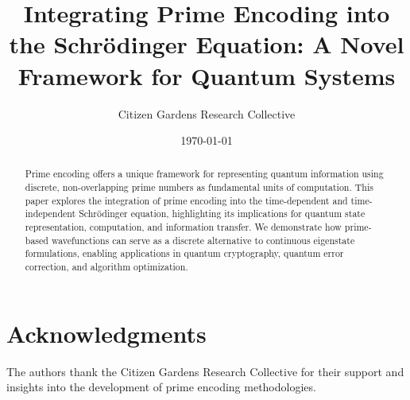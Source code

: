 \documentclass{article}
\title{Integrating Prime Encoding into the Schrödinger Equation: A Novel Framework for Quantum Systems}
\author{Citizen Gardens Research Collective}
\date{\today}
\theoremstyle{plain}
\begin{document}
\maketitle

\begin{abstract}
Prime encoding offers a unique framework for representing quantum information using discrete, non-overlapping prime numbers as fundamental units of computation. This paper explores the integration of prime encoding into the time-dependent and time-independent Schrödinger equation, highlighting its implications for quantum state representation, computation, and information transfer. We demonstrate how prime-based wavefunctions can serve as a discrete alternative to continuous eigenstate formulations, enabling applications in quantum cryptography, quantum error correction, and algorithm optimization.
\end{abstract}



\section*{Acknowledgments}
The authors thank the Citizen Gardens Research Collective for their support and insights into the development of prime encoding methodologies.



\end{document}
